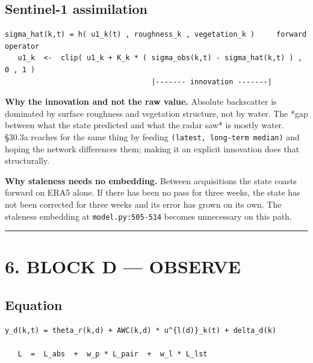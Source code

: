 \documentclass[10pt,a4paper]{article}
\begin{document}
\subsection*{Sentinel-1 assimilation}

\begin{Verbatim}[fontsize=\scriptsize,frame=leftline,framerule=0.6pt,rulecolor=\color{rulegray},xleftmargin=6pt,framesep=6pt,]
   sigma_hat(k,t) = h( u1_k(t) , roughness_k , vegetation_k )     forward operator
   u1_k  <-  clip( u1_k + K_k * ( sigma_obs(k,t) - sigma_hat(k,t) ) , 0 , 1 )
                                  |------- innovation -------|
\end{Verbatim}

\textbf{Why the innovation and not the raw value.} Absolute backscatter is dominated
by surface roughness and vegetation structure, not by water. The *gap between
what the state predicted and what the radar saw* is mostly water. §30.3a reaches
for the same thing by feeding \texttt{(latest, long-term median)} and hoping the network
differences them; making it an explicit innovation does that structurally.

\textbf{Why staleness needs no embedding.} Between acquisitions the state coasts
forward on ERA5 alone. If there has been no pass for three weeks, the state has
not been corrected for three weeks and its error has grown on its own. The
staleness embedding at \texttt{model.py:505-514} becomes unnecessary on this path.

\medskip\hrule\medskip

\section*{6. BLOCK D — OBSERVE}

\subsection*{Equation}

\begin{Verbatim}[fontsize=\scriptsize,frame=leftline,framerule=0.6pt,rulecolor=\color{rulegray},xleftmargin=6pt,framesep=6pt,]
   y_d(k,t) = theta_r(k,d) + AWC(k,d) * u^{l(d)}_k(t) + delta_d(k)

   L  =  L_abs  +  w_p * L_pair  +  w_l * L_lst
\end{Verbatim}
\end{document}
